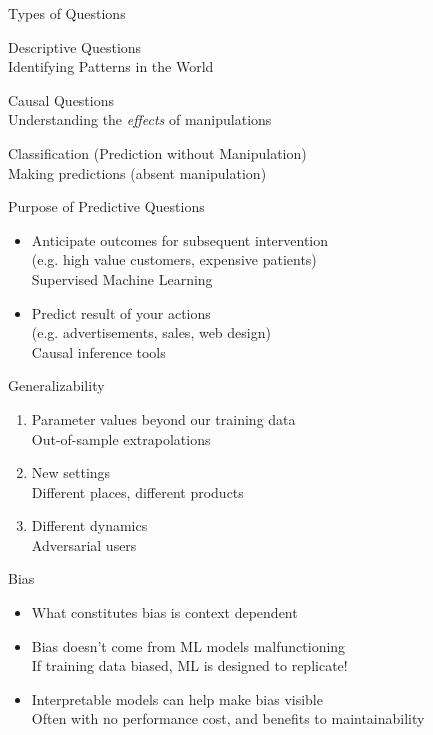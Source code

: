 \documentclass[11pt]{beamer}
\begin{document}
\begin{frame}[c]{Types of Questions}
  \begin{enumerate}
    {\color{gray} \item {Descriptive Questions} \\
    {\color{gray} Identifying Patterns in the World} 
    \item \alert{Causal Questions} \\
    {\color{gray} Understanding the \emph{effects} of manipulations}}
    \color{gray} \item Classification (Prediction without Manipulation) \\
    {\color{gray} Making predictions (absent manipulation)}
  \end{enumerate}
\end{frame}



\begin{frame}[c]{Purpose of Predictive Questions}
\begin{itemize}
  \pause \item Anticipate outcomes for subsequent intervention \\
  (e.g. high value customers, expensive patients) \\
  {\color{gray} Supervised Machine Learning}
  \pause \item Predict result of your actions \\
  (e.g. advertisements, sales, web design) \\
  {\color{gray} Causal inference tools} 
\end{itemize}
\end{frame}

\begin{frame}[c]{Generalizability}
\begin{enumerate}
  \pause \item Parameter values beyond our training data \\
  {\color{gray} Out-of-sample extrapolations}
  \pause \item New settings \\
  {\color{gray} Different places, different products}
  \pause \item Different dynamics \\
  {\color{gray} Adversarial users}
\end{enumerate}
\end{frame}

\begin{frame}[c]{Bias}
\begin{itemize}
  \item What constitutes bias is context dependent
  \pause \item Bias doesn't come from ML models malfunctioning \\
  {\color{gray} If training data biased, ML is designed to replicate!} 
  \pause \item Interpretable models can help make bias visible \\
  {\color{gray} Often with no performance cost, and benefits to maintainability} 
\end{itemize}
\end{frame}
\end{document}
